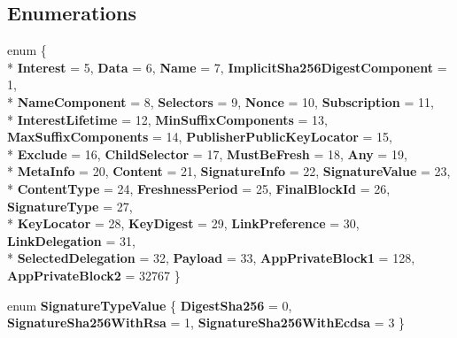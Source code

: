 \subsection*{Enumerations}
\begin{DoxyCompactItemize}
\item 
enum \{ \\*
{\bfseries Interest} = 5, 
{\bfseries Data} = 6, 
{\bfseries Name} = 7, 
{\bfseries Implicit\+Sha256\+Digest\+Component} = 1, 
\\*
{\bfseries Name\+Component} = 8, 
{\bfseries Selectors} = 9, 
{\bfseries Nonce} = 10, 
{\bfseries Subscription} = 11, 
\\*
{\bfseries Interest\+Lifetime} = 12, 
{\bfseries Min\+Suffix\+Components} = 13, 
{\bfseries Max\+Suffix\+Components} = 14, 
{\bfseries Publisher\+Public\+Key\+Locator} = 15, 
\\*
{\bfseries Exclude} = 16, 
{\bfseries Child\+Selector} = 17, 
{\bfseries Must\+Be\+Fresh} = 18, 
{\bfseries Any} = 19, 
\\*
{\bfseries Meta\+Info} = 20, 
{\bfseries Content} = 21, 
{\bfseries Signature\+Info} = 22, 
{\bfseries Signature\+Value} = 23, 
\\*
{\bfseries Content\+Type} = 24, 
{\bfseries Freshness\+Period} = 25, 
{\bfseries Final\+Block\+Id} = 26, 
{\bfseries Signature\+Type} = 27, 
\\*
{\bfseries Key\+Locator} = 28, 
{\bfseries Key\+Digest} = 29, 
{\bfseries Link\+Preference} = 30, 
{\bfseries Link\+Delegation} = 31, 
\\*
{\bfseries Selected\+Delegation} = 32, 
{\bfseries Payload} = 33, 
{\bfseries App\+Private\+Block1} = 128, 
{\bfseries App\+Private\+Block2} = 32767
 \}\hypertarget{namespacendn_1_1tlv_adb41a14044a0dd68da374db98ca8fa23}{}\label{namespacendn_1_1tlv_adb41a14044a0dd68da374db98ca8fa23}

\item 
enum {\bfseries Signature\+Type\+Value} \{ {\bfseries Digest\+Sha256} = 0, 
{\bfseries Signature\+Sha256\+With\+Rsa} = 1, 
{\bfseries Signature\+Sha256\+With\+Ecdsa} = 3
 \}\hypertarget{namespacendn_1_1tlv_af03409daf45b893fd14b56fefa2578b5}{}\label{namespacendn_1_1tlv_af03409daf45b893fd14b56fefa2578b5}


\end{DoxyCompactItemize}
